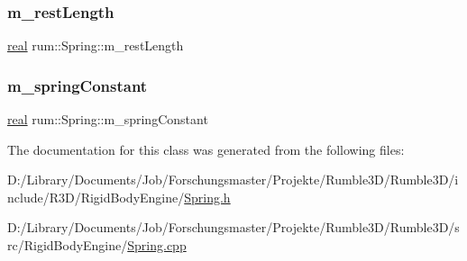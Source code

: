 \mbox{\label{classrum_1_1_spring_a78a5d56210e733d7bb92e02a98ee4d49}} 
\subsubsection{\texorpdfstring{m\+\_\+rest\+Length}{m\_restLength}}
{\footnotesize\ttfamily \mbox{\hyperlink{namespacerum_a7e8cca23573d5eaead0f138cbaa4862c}{real}} rum\+::\+Spring\+::m\+\_\+rest\+Length\hspace{0.3cm}{\ttfamily [protected]}}

\mbox{\label{classrum_1_1_spring_a820806622160bcdd02d756a1cabadc20}} 
\subsubsection{\texorpdfstring{m\+\_\+spring\+Constant}{m\_springConstant}}
{\footnotesize\ttfamily \mbox{\hyperlink{namespacerum_a7e8cca23573d5eaead0f138cbaa4862c}{real}} rum\+::\+Spring\+::m\+\_\+spring\+Constant\hspace{0.3cm}{\ttfamily [protected]}}



The documentation for this class was generated from the following files\+:\begin{DoxyCompactItemize}
\item 
D\+:/\+Library/\+Documents/\+Job/\+Forschungsmaster/\+Projekte/\+Rumble3\+D/\+Rumble3\+D/include/\+R3\+D/\+Rigid\+Body\+Engine/\mbox{\hyperlink{_spring_8h}{Spring.\+h}}\item 
D\+:/\+Library/\+Documents/\+Job/\+Forschungsmaster/\+Projekte/\+Rumble3\+D/\+Rumble3\+D/src/\+Rigid\+Body\+Engine/\mbox{\hyperlink{_spring_8cpp}{Spring.\+cpp}}\end{DoxyCompactItemize}
